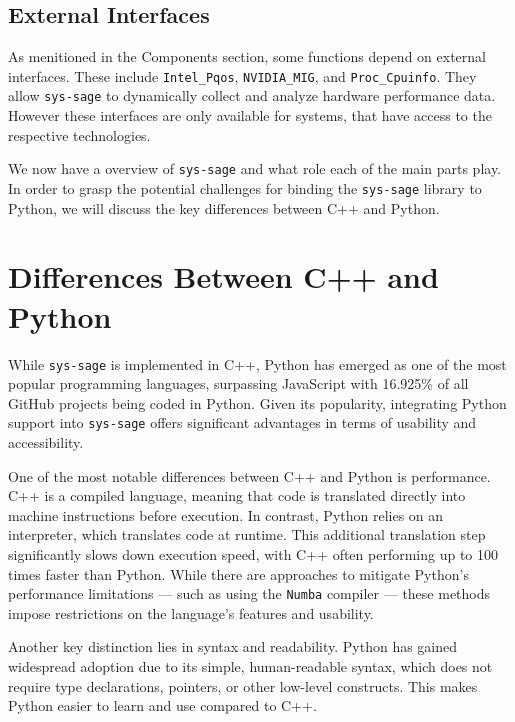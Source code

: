 \subsection{External Interfaces}

As menitioned in the Components section, some functions depend on external interfaces. These include \texttt{Intel\_Pqos}, \texttt{NVIDIA\_MIG}, and \texttt{Proc\_Cpuinfo}. They allow \texttt{sys-sage} to dynamically collect and analyze hardware performance data. However these interfaces are only available for systems, that have access to the respective technologies.\cite{sys-sage-docu}

We now have a overview of \texttt{sys-sage} and what role each of the main parts play. In order to grasp the potential challenges for binding the \texttt{sys-sage} library to Python, we will discuss the key differences between C++ and Python.

\section{Differences Between C++ and Python}

While \texttt{sys-sage} is implemented in C++, Python has emerged as one of the most popular programming languages, surpassing JavaScript with 16.925\% of all GitHub projects being coded in Python. Given its popularity, integrating Python support into \texttt{sys-sage} offers significant advantages in terms of usability and accessibility. \cite{languages-github-stats}

One of the most notable differences between C++ and Python is performance. C++ is a compiled language, meaning that code is translated directly into machine instructions before execution. In contrast, Python relies on an interpreter, which translates code at runtime. This additional translation step significantly slows down execution speed, with C++ often performing up to 100 times faster than Python. While there are approaches to mitigate Python's performance limitations — such as using the \texttt{Numba} compiler \parencite{numba} — these methods impose restrictions on the language’s features and usability.\cite{languages-performance}

Another key distinction lies in syntax and readability. Python has gained widespread adoption due to its simple, human-readable syntax, which does not require type declarations, pointers, or other low-level constructs. This makes Python easier to learn and use compared to C++.

